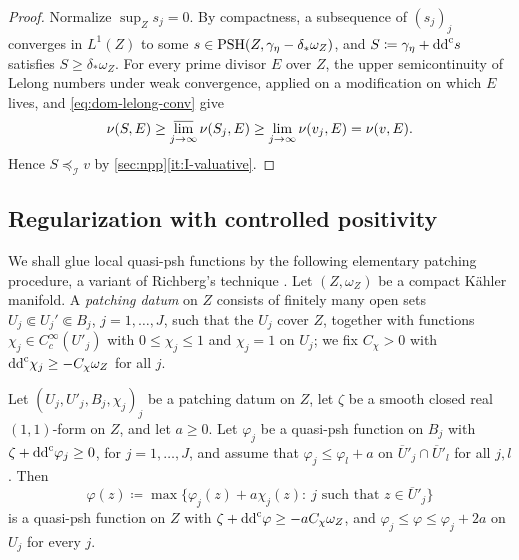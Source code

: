 \documentclass[11pt,a4paper]{amsart}
\newcommand{\lessI}{\preceq_{\mathcal I}}
\theoremstyle{definition}
\begin{document}
\begin{proof}
Normalize $\sup_Zs_j=0$. By compactness, a subsequence of $(s_j)_j$
converges in $L^1(Z)$ to some $s\in\mathrm{PSH}(Z,\gamma_\eta-\delta_*\omega_Z)$,
and $S\coloneqq\gamma_\eta+\mathrm{dd}^{\mathrm{c}} s$ satisfies $S\ge\delta_*\omega_Z$. For
every prime divisor $E$ over $Z$, the upper semicontinuity of Lelong
numbers under weak convergence, applied on a modification on which $E$
lives, and \eqref{eq:dom-lelong-conv} give
\[
  \nu(S,E)\ge\varlimsup_{j\to\infty}\nu(S_j,E)
  \ge\lim_{j\to\infty}\nu(v_j,E)=\nu(v,E).
\]
Hence $S\lessI v$ by \cref{sec:npp}\ref{it:I-valuative}.
\end{proof}

\subsection{Regularization with controlled positivity}

We shall glue local quasi-psh functions by the following elementary
patching procedure, a variant of Richberg's technique \cite{Ric68}. Let
$(Z,\omega_Z)$ be a compact K\"ahler manifold. A \emph{patching datum}
on $Z$ consists of finitely many open sets
$U_j\Subset U_j'\Subset B_j$, $j=1,\dots,J$, such that the $U_j$ cover
$Z$, together with functions $\chi_j\in C^\infty_c(U'_j)$ with
$0\le\chi_j\le1$ and $\chi_j=1$ on $U_j$; we fix $C_\chi>0$ with
$\mathrm{dd}^{\mathrm{c}}\chi_j\ge-C_\chi\omega_Z$ for all $j$.

\begin{lemma}\label{lem:patching}
Let $(U_j,U'_j,B_j,\chi_j)_j$ be a patching datum on $Z$, let $\zeta$ be a
smooth closed real $(1,1)$-form on $Z$, and let $a\ge0$. Let $\varphi_j$
be a quasi-psh function on $B_j$ with $\zeta+\mathrm{dd}^{\mathrm{c}}\varphi_j\ge0$, for
$j=1,\dots,J$, and assume that $\varphi_j\le\varphi_l+a$ on
$\overline U{}'_j\cap\overline U{}'_l$ for all $j,l$. Then
\[
  \varphi(z)\coloneqq\max\bigl\{\varphi_j(z)+a\chi_j(z):\
  j\text{ such that }z\in\overline U{}'_j\bigr\}
\]
is a quasi-psh function on $Z$ with $\zeta+\mathrm{dd}^{\mathrm{c}}\varphi\ge-aC_\chi\omega_Z$,
and $\varphi_j\le\varphi\le\varphi_j+2a$ on $U_j$ for every $j$.
\end{lemma}
\end{document}
